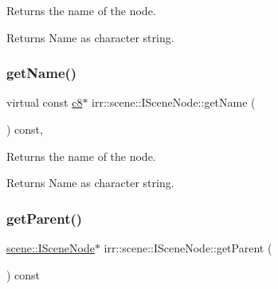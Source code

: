 Returns the name of the node. 

\begin{DoxyReturn}{Returns}
Name as character string. 
\end{DoxyReturn}
\mbox{\label{classirr_1_1scene_1_1ISceneNode_ab0e72b38949f926a1929468cd2b1ce16}} 
\subsubsection{\texorpdfstring{get\+Name()}{getName()}\hspace{0.1cm}{\footnotesize\ttfamily [2/2]}}
{\footnotesize\ttfamily virtual const \hyperlink{namespaceirr_a9395eaea339bcb546b319e9c96bf7410}{c8}$\ast$ irr\+::scene\+::\+I\+Scene\+Node\+::get\+Name (\begin{DoxyParamCaption}{ }\end{DoxyParamCaption}) const\hspace{0.3cm}{\ttfamily [inline]}, {\ttfamily [virtual]}}



Returns the name of the node. 

\begin{DoxyReturn}{Returns}
Name as character string. 
\end{DoxyReturn}
\mbox{\label{classirr_1_1scene_1_1ISceneNode_adf77e3715d63e436cc691bf881c4eb5b}} 
\subsubsection{\texorpdfstring{get\+Parent()}{getParent()}\hspace{0.1cm}{\footnotesize\ttfamily [1/2]}}
{\footnotesize\ttfamily \hyperlink{classirr_1_1scene_1_1ISceneNode}{scene\+::\+I\+Scene\+Node}$\ast$ irr\+::scene\+::\+I\+Scene\+Node\+::get\+Parent (\begin{DoxyParamCaption}{ }\end{DoxyParamCaption}) const\hspace{0.3cm}{\ttfamily [inline]}}



